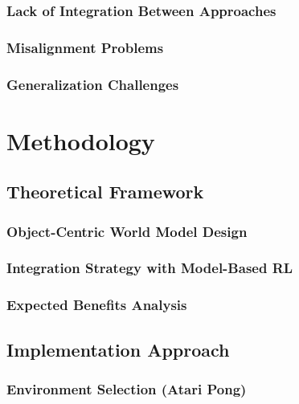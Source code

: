 \documentclass[
	english,
	ruledheaders=section,
	class=report,
	thesis={type=master},
	accentcolor=9c,
	custommargins=true,
	marginpar=false,
	parskip=half-,
	fontsize=11pt,
]{tudapub}
\begin{document}
\subsection{Lack of Integration Between Approaches}
\label{subsec:integration_gap}

\subsection{Misalignment Problems}
\label{subsec:misalignment}

\subsection{Generalization Challenges}
\label{subsec:gen_challenges}

\chapter{Methodology}
\label{chap:methodology}

\section{Theoretical Framework}
\label{sec:framework}

\subsection{Object-Centric World Model Design}
\label{subsec:oc_world_model}

\subsection{Integration Strategy with Model-Based RL}
\label{subsec:integration_strategy}

\subsection{Expected Benefits Analysis}
\label{subsec:benefits_analysis}

\section{Implementation Approach}
\label{sec:implementation_approach}

\subsection{Environment Selection (Atari Pong)}
\label{subsec:env_selection}
\end{document}
